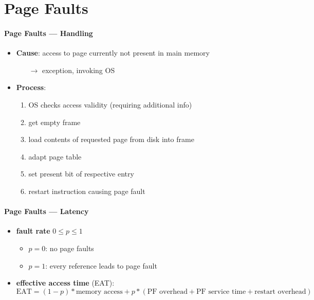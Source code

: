 \section{Page Faults}

\paragraph{Page Faults --- Handling}
\begin{itemize}
  \item \textbf{Cause}: access to page currently not present in main memory
  \begin{itemize}
    \item[$ \to $] exception, invoking OS
  \end{itemize}
  \item \textbf{Process}:
  \begin{enumerate}
    \item OS checks access validity (requiring additional info)
    \item get empty frame
    \item load contents of requested page from disk into frame
    \item adapt page table
    \item set present bit of respective entry
    \item restart instruction causing page fault
  \end{enumerate}
\end{itemize}

\paragraph{Page Faults --- Latency}
\begin{itemize}
  \item \textbf{fault rate} $ 0 \leq p \leq 1 $
  \begin{itemize}
    \item $ p = 0 $: no page faults
    \item $ p = 1 $: every reference leads to page fault
  \end{itemize}
  \item \textbf{effective access time} (EAT):
  \begin{equation*}
    \text{EAT} = (1-p)*\text{memory access} + p*(\text{PF overhead} + \text{PF service time} + \text{restart overhead})
  \end{equation*}
\end{itemize}

